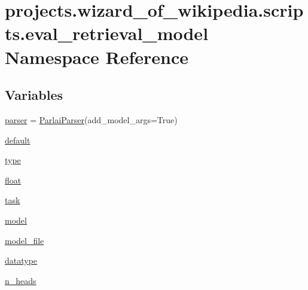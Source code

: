 \hypertarget{namespaceprojects_1_1wizard__of__wikipedia_1_1scripts_1_1eval__retrieval__model}{}\section{projects.\+wizard\+\_\+of\+\_\+wikipedia.\+scripts.\+eval\+\_\+retrieval\+\_\+model Namespace Reference}
\label{namespaceprojects_1_1wizard__of__wikipedia_1_1scripts_1_1eval__retrieval__model}
\subsection*{Variables}
\begin{DoxyCompactItemize}
\item 
\hyperlink{namespaceprojects_1_1wizard__of__wikipedia_1_1scripts_1_1eval__retrieval__model_a34e16cfd6f3b5f0f7862d12015cff906}{parser} = \hyperlink{classparlai_1_1core_1_1params_1_1ParlaiParser}{Parlai\+Parser}(add\+\_\+model\+\_\+args=True)
\item 
\hyperlink{namespaceprojects_1_1wizard__of__wikipedia_1_1scripts_1_1eval__retrieval__model_a990de8456f40c15f5adae005e1791e0e}{default}
\item 
\hyperlink{namespaceprojects_1_1wizard__of__wikipedia_1_1scripts_1_1eval__retrieval__model_ab86c7688750e6401627c950e1cc4dec4}{type}
\item 
\hyperlink{namespaceprojects_1_1wizard__of__wikipedia_1_1scripts_1_1eval__retrieval__model_a5d9265fb70b57e0dc7fb2d7a4f9318a2}{float}
\item 
\hyperlink{namespaceprojects_1_1wizard__of__wikipedia_1_1scripts_1_1eval__retrieval__model_ad9fbaa9e3d4bdd2e61231866f3e9ff8d}{task}
\item 
\hyperlink{namespaceprojects_1_1wizard__of__wikipedia_1_1scripts_1_1eval__retrieval__model_adabee7ea9d8da003508fd0bacebb70fb}{model}
\item 
\hyperlink{namespaceprojects_1_1wizard__of__wikipedia_1_1scripts_1_1eval__retrieval__model_ac157d6348174ac205e8c3bda7b7d293d}{model\+\_\+file}
\item 
\hyperlink{namespaceprojects_1_1wizard__of__wikipedia_1_1scripts_1_1eval__retrieval__model_ad045cf4630e369b52c99c73b080f7bbf}{datatype}
\item 
\hyperlink{namespaceprojects_1_1wizard__of__wikipedia_1_1scripts_1_1eval__retrieval__model_a75fc1e002ce9bcd258f81f37596097eb}{n\+\_\+heads}

\end{DoxyCompactItemize}
